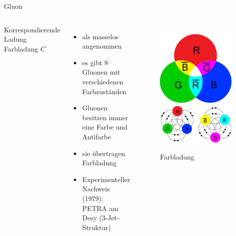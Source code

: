 \documentclass[aspectratio=169,xcolor=dvipsnames]{beamer}
\begin{document}
\begin{frame}{Gluon}
    \begin{columns}[c]
        \begin{block}{Korrespondierende Ladung}
            Farbladung $C$
        \end{block}
        \vspace{10pt}
        \begin{itemize}
            \item als masselos angenommen
            \item es gibt 8 Gluonen mit verschiedenen Farbzuständen
            \item Gluonen besitzen immer eine Farbe und Antifarbe
            \item sie übertragen Farbladung
            \item Experimenteller Nachweis (1979): PETRA am Desy (3-Jet-Struktur)
        \end{itemize}
        \begin{figure}
            \centering
            \includegraphics[width=0.35\linewidth]{figures/colors.png}
            \includegraphics[width=0.8\linewidth]{figures/colorcharge.png}
            \caption{Farbladung}
            \label{fig:colorcharge}
        \end{figure}
    \end{columns}
\end{frame}
\end{document}
